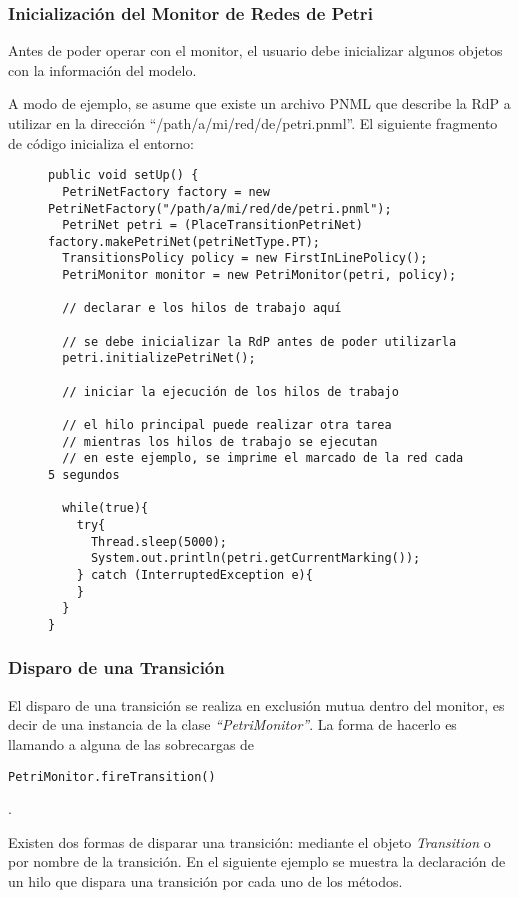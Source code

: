 \subsubsection{Inicialización del Monitor de Redes de Petri}

Antes de poder operar con el monitor, el usuario debe inicializar algunos
objetos con la información del modelo.

A modo de ejemplo, se asume que existe un archivo PNML que describe la RdP a
utilizar en la dirección ``/path/a/mi/red/de/petri.pnml''. El siguiente
fragmento de código inicializa  el entorno:

\begin{figure}[H]
\centering
\begin{verbatim}
public void setUp() {
  PetriNetFactory factory = new PetriNetFactory("/path/a/mi/red/de/petri.pnml");
  PetriNet petri = (PlaceTransitionPetriNet) factory.makePetriNet(petriNetType.PT);
  TransitionsPolicy policy = new FirstInLinePolicy();
  PetriMonitor monitor = new PetriMonitor(petri, policy);
  
  // declarar e los hilos de trabajo aquí
  
  // se debe inicializar la RdP antes de poder utilizarla
  petri.initializePetriNet();
  
  // iniciar la ejecución de los hilos de trabajo
  
  // el hilo principal puede realizar otra tarea
  // mientras los hilos de trabajo se ejecutan
  // en este ejemplo, se imprime el marcado de la red cada 5 segundos
  
  while(true){
    try{
      Thread.sleep(5000);
      System.out.println(petri.getCurrentMarking());
    } catch (InterruptedException e){
    }
  }
}
\end{verbatim}
\end{figure}

\subsubsection{Disparo de una Transición}

El disparo de una transición se realiza en exclusión mutua dentro del monitor,
es decir de una instancia de la clase \textit{``PetriMonitor''}. La forma de
hacerlo es llamando a alguna de las sobrecargas de 
\begin{verbatim}
PetriMonitor.fireTransition()
\end{verbatim}
.

Existen dos formas de disparar una transición: mediante el objeto
\textit{Transition} o por nombre de la transición.
En el siguiente ejemplo se muestra la declaración de un hilo que dispara una
transición por cada uno de los métodos.

